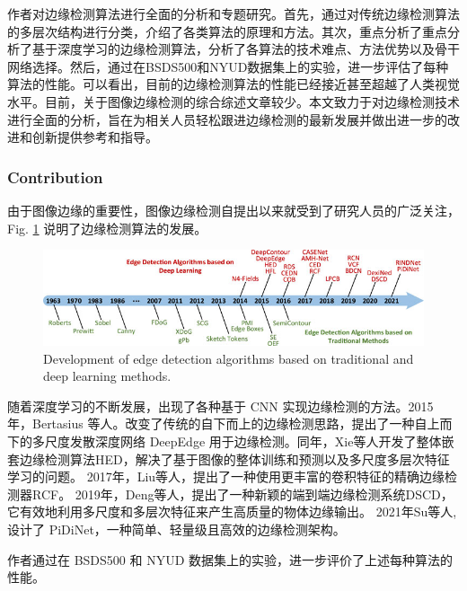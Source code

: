 \documentclass[a4paper, 10pt]{article}
\begin{document}
			作者对边缘检测算法进行全面的分析和专题研究。首先，通过对传统边缘检测算法的多层次结构进行分类，介绍了各类算法的原理和方法。其次，重点分析了重点分析了基于深度学习的边缘检测算法，分析了各算法的技术难点、方法优势以及骨干网络选择。然后，通过在BSDS500和NYUD数据集上的实验，进一步评估了每种算法的性能。可以看出，目前的边缘检测算法的性能已经接近甚至超越了人类视觉水平。目前，关于图像边缘检测的综合综述文章较少。本文致力于对边缘检测技术进行全面的分析，旨在为相关人员轻松跟进边缘检测的最新发展并做出进一步的改进和创新提供参考和指导。
			
			\subsubsection{Contribution}
			
			由于图像边缘的重要性，图像边缘检测自提出以来就受到了研究人员的广泛关注，Fig. \ref{fig: Development} 说明了边缘检测算法的发展。
			
			\begin{figure}[htbp]
				\centering 
				\includegraphics[width=\columnwidth]{picture/Edge Detection/Development}
				\caption{
					\label{fig: Development} 
					Development of edge detection algorithms based on traditional and deep learning methods.
				}
			\end{figure}
			
			随着深度学习的不断发展，出现了各种基于 CNN 实现边缘检测的方法。2015 年，Bertasius 等人。改变了传统的自下而上的边缘检测思路，提出了一种自上而下的多尺度发散深度网络 DeepEdge \cite{bertasius2015high} 用于边缘检测。同年，Xie等人开发了整体嵌套边缘检测算法HED\cite{xie2015holistically}，解决了基于图像的整体训练和预测以及多尺度多层次特征学习的问题。 2017年，Liu等人，提出了一种使用更丰富的卷积特征的精确边缘检测器RCF\cite{liu2017richer}。 2019年，Deng等人，提出了一种新颖的端到端边缘检测系统DSCD\cite{deng2020deep}，它有效地利用多尺度和多层次特征来产生高质量的物体边缘输出。 2021年Su等人,设计了 PiDiNet\cite{su2021pixel}，一种简单、轻量级且高效的边缘检测架构。
			
			作者通过在 BSDS500 和 NYUD 数据集上的实验，进一步评价了上述每种算法的性能。
			
\end{document}
